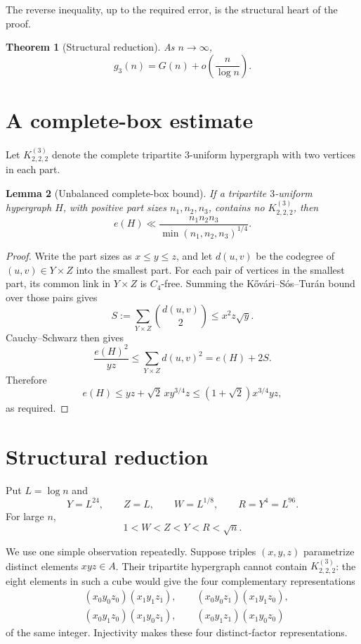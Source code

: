 \documentclass[11pt,reqno]{article}
\newtheorem{theorem}{Theorem}[section]
\newtheorem{lemma}[theorem]{Lemma}
\theoremstyle{definition}
\begin{document}
The reverse inequality, up to the required error, is the structural heart
of the proof.

\begin{theorem}[Structural reduction]\label{thm:structural}
As \(n\to\infty\),
\[
  g_3(n)=G(n)+o\left(\frac n{\log n}\right).
\]
\end{theorem}

\section{A complete-box estimate}\label{sec:box}

Let \(K^{(3)}_{2,2,2}\) denote the complete tripartite \(3\)-uniform
hypergraph with two vertices in each part.

\begin{lemma}[Unbalanced complete-box bound]\label{lem:box}
If a tripartite \(3\)-uniform hypergraph \(H\), with positive part sizes
\(n_1,n_2,n_3\), contains no \(K^{(3)}_{2,2,2}\), then
\[
  e(H)\ll
  \frac{n_1n_2n_3}{\min(n_1,n_2,n_3)^{1/4}}.
\]
\end{lemma}

\begin{proof}
Write the part sizes as \(x\leq y\leq z\), and let \(d(u,v)\) be the
codegree of \((u,v)\in Y\times Z\) into the smallest part.  For each pair of
vertices in the smallest part, its common link in \(Y\times Z\) is
\(C_4\)-free.  Summing the K\H{o}v\'ari--S\'os--Tur\'an bound
\cite{KovariSosTuran1954} over those pairs gives
\[
  S:=\sum_{Y\times Z}\binom{d(u,v)}2\leq x^2z\sqrt y.
\]
Cauchy--Schwarz then gives
\[
  \frac{e(H)^2}{yz}
  \leq\sum_{Y\times Z}d(u,v)^2
  =e(H)+2S.
\]
Therefore
\[
  e(H)\leq yz+\sqrt2\,xy^{3/4}z
  \leq(1+\sqrt2)x^{3/4}yz,
\]
as required.
\end{proof}

\section{Structural reduction}\label{sec:structural}

Put \(L=\log n\) and
\begin{equation}\label{eq:parameters}
  Y=L^{24},\qquad Z=L,\qquad W=L^{1/8},\qquad R=Y^4=L^{96}.
\end{equation}
For large \(n\),
\[
  1<W<Z<Y<R<\sqrt n.
\]

We use one simple observation repeatedly.  Suppose triples
\((x,y,z)\) parametrize distinct elements \(xyz\in A\).  Their tripartite
hypergraph cannot contain \(K^{(3)}_{2,2,2}\): the eight elements in such a
cube would give the four complementary representations
\[
\begin{split}
 &(x_0y_0z_0)(x_1y_1z_1),\qquad
 (x_0y_0z_1)(x_1y_1z_0),\\
 &(x_0y_1z_0)(x_1y_0z_1),\qquad
 (x_0y_1z_1)(x_1y_0z_0)
\end{split}
\]
of the same integer.  Injectivity makes these four distinct-factor
representations.
\end{document}
